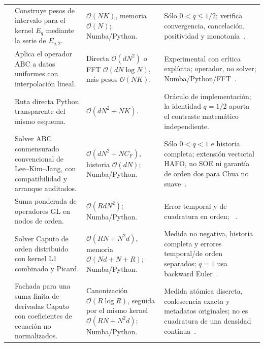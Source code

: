 \begin{center}
\begin{longtable}{@{}L{0.23\textwidth}L{0.23\textwidth}L{0.23\textwidth}L{0.23\textwidth}@{}}
\addlinespace
{} & Construye pesos de intervalo para el kernel \(E_q\) mediante la serie de \(E_{q,2}\). & \(\mathcal O(NK)\), memoria \(\mathcal O(N)\); Numba/Python. & Sólo \(0<q\le1/2\); verifica convergencia, cancelación, positividad y monotonía~\cite{YadavEtAl2019}. \\
\addlinespace
{} & Aplica el operador ABC a datos uniformes con interpolación lineal. & Directa \(\mathcal O(dN^2)\) o FFT \(\mathcal O(dN\log N)\), más pesos \(\mathcal O(NK)\). & Experimental con crítica explícita; operador, no solver; Numba/Python/FFT~\cite{AtanganaBaleanu2016,DiethelmEtAl2020}. \\
\addlinespace
{} & Ruta directa Python transparente del mismo esquema. & \(\mathcal O(dN^2+NK)\). & Oráculo de implementación; la identidad \(q=1/2\) aporta el contraste matemático independiente. \\
\addlinespace
{} & Solver ABC conmensurado convencional de Lee--Kim--Jang, con compatibilidad y arranque auditados. & \(\mathcal O(dN^2+NC_F)\), historia \(\mathcal O(dN)\); Numba/Python. & Sólo \(0<q<1\) e historia completa; extensión vectorial HAFO, no SOE ni garantía de orden dos para Chua no suave~\cite{LeeKimJang2024,DiethelmEtAl2020}. \\
\addlinespace
{} & Suma ponderada de operadores GL en nodos de orden. & \(\mathcal O(RdN^2)\); Numba/Python. & Error temporal y de cuadratura en orden; ~\cite{CaputoDistributed2001,DiethelmFord2009}. \\
\addlinespace
{} & Solver Caputo de orden distribuido con kernel L1 combinado y Picard. & \(\mathcal O(RN+N^2d)\), memoria \(\mathcal O(Nd+N+R)\); Numba/Python. & Medida no negativa, historia completa y errores temporal/de orden separados; \(q=1\) usa backward Euler~\cite{DiethelmFord2009,HuEtAl2014Distributed,LinXu2007L1}. \\
\addlinespace
{} & Fachada para una suma finita de derivadas Caputo con coeficientes de ecuación no normalizados. & Canonización \(\mathcal O(R\log R)\), seguida por el mismo kernel \(\mathcal O(RN+N^2d)\); Numba/Python. & Medida atómica discreta, coalescencia exacta y metadatos originales; no es cuadratura de una densidad continua~\cite{DiethelmFord2004MultiOrder,RenSun2014MultiTerm,SheLiSun2022TransformedL1,ZakyMachado2020Atomic}. \\
\bottomrule
\end{longtable}
\end{center}

